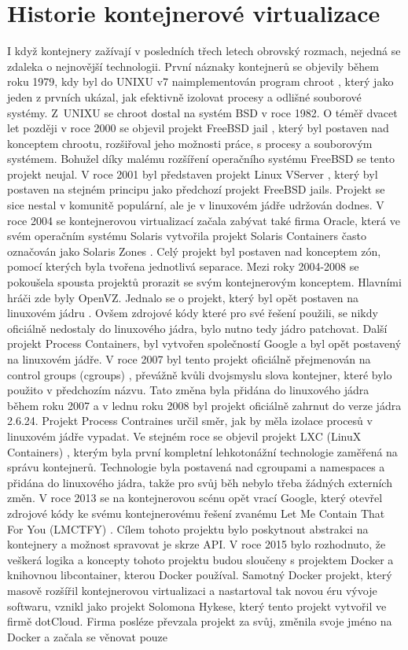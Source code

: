 \section{Historie kontejnerové virtualizace}
I když kontejnery zažívají v posledních třech letech obrovský rozmach, nejedná se zdaleka o nejnovější technologii. První náznaky kontejnerů se objevily během roku 1979, kdy byl do UNIXU v7 naimplementován program chroot \cite{chroot}, který jako jeden z prvních ukázal, jak efektivně izolovat procesy a odlišné souborové systémy. Z UNIXU se chroot dostal na systém BSD v roce 1982. O téměř dvacet let později v roce 2000 se objevil projekt FreeBSD jail \cite{freebsd_jail}, který byl postaven nad konceptem chrootu, rozšiřoval jeho možnosti práce, s procesy a souborovým systémem. Bohužel díky malému rozšíření operačního systému FreeBSD se tento projekt neujal. V roce 2001 byl představen projekt Linux VServer \cite{linux_vserver}, který byl postaven na stejném principu jako předchozí projekt FreeBSD jails. Projekt se sice nestal v komunitě populární, ale je v linuxovém jádře udržován dodnes. V roce 2004 se kontejnerovou virtualizací začala zabývat také firma Oracle, která ve svém operačním systému Solaris vytvořila projekt Solaris Containers často označován jako Solaris Zones \cite{solaris_zones}. Celý projekt byl postaven nad konceptem zón, pomocí kterých byla tvořena jednotlivá separace. Mezi roky 2004-2008 se pokoušela spousta projektů prorazit se svým kontejnerovým konceptem. Hlavními hráči zde byly OpenVZ. Jednalo se o projekt, který byl opět postaven na linuxovém jádru \cite{openvz}. Ovšem zdrojové kódy které pro své řešení použili, se nikdy oficiálně nedostaly do linuxového jádra, bylo nutno tedy jádro patchovat. Další projekt Process Containers, byl vytvořen společností Google a byl opět postavený na linuxovém jádře. V roce 2007 byl tento projekt oficiálně přejmenován na control groups (cgroups) \cite{pc_cgroups}, převážně kvůli dvojsmyslu slova kontejner, které bylo použito v předchozím názvu. Tato změna byla přidána do linuxového jádra během roku 2007 a v lednu roku 2008 byl projekt oficiálně zahrnut do verze jádra 2.6.24. Projekt Process Contraines určil směr, jak by měla izolace procesů v linuxovém jádře vypadat. Ve stejném roce se objevil projekt LXC (LinuX Containers) \cite{lxc}, kterým byla první kompletní lehkotonážní technologie zaměřená na správu kontejnerů. Technologie byla postavená nad cgroupami a namespaces a přidána do linuxového jádra, takže pro svůj běh nebylo třeba žádných externích změn. V roce 2013 se na kontejnerovou scénu opět vrací Google, který otevřel zdrojové kódy ke svému kontejnerovému řešení zvanému Let Me Contain That For You (LMCTFY) \cite{lmctfy}. Cílem tohoto projektu bylo poskytnout abstrakci na kontejnery a možnost spravovat je skrze API. V roce 2015 bylo rozhodnuto, že veškerá logika a koncepty tohoto projektu budou sloučeny s projektem Docker a knihovnou libcontainer, kterou Docker používal. Samotný Docker projekt, který masově rozšířil kontejnerovou virtualizaci a nastartoval tak novou éru vývoje softwaru, vznikl jako projekt Solomona Hykese, který tento projekt vytvořil ve firmě dotCloud. Firma posléze převzala projekt za svůj, změnila svoje jméno na Docker a začala se věnovat pouze 